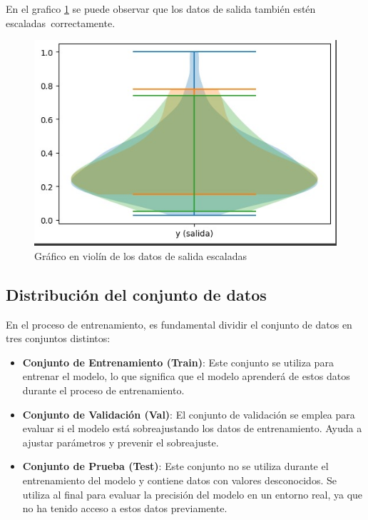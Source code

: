 En el grafico \ref{fig:grafico_violin_salida} se puede observar que los datos
de salida también estén escaladas correctamente.
\begin{figure}[H]
  \begin{center}
    \includegraphics[scale=0.50]{./grafico_violin_salida.jpg}
    \caption{Gráfico en violín de los datos de salida escaladas}
    \label{fig:grafico_violin_salida}
  \end{center}
\end{figure}

\subsection{Distribución del conjunto de datos}

En el proceso de entrenamiento, es fundamental dividir el conjunto de datos en
tres conjuntos distintos:

\begin{itemize}
  \item \textbf{Conjunto de Entrenamiento (Train)}: Este conjunto se utiliza para entrenar el modelo, lo que significa que el modelo aprenderá de estos datos durante el proceso de entrenamiento.

  \item \textbf{Conjunto de Validación (Val)}: El conjunto de validación se emplea para evaluar si el modelo está sobreajustando los datos de entrenamiento. Ayuda a ajustar parámetros y prevenir el sobreajuste.

  \item \textbf{Conjunto de Prueba (Test)}: Este conjunto no se utiliza durante el entrenamiento del modelo y contiene datos con valores desconocidos. Se utiliza al final para evaluar la precisión del modelo en un entorno real, ya que no ha tenido acceso a estos datos previamente.
\end{itemize}

